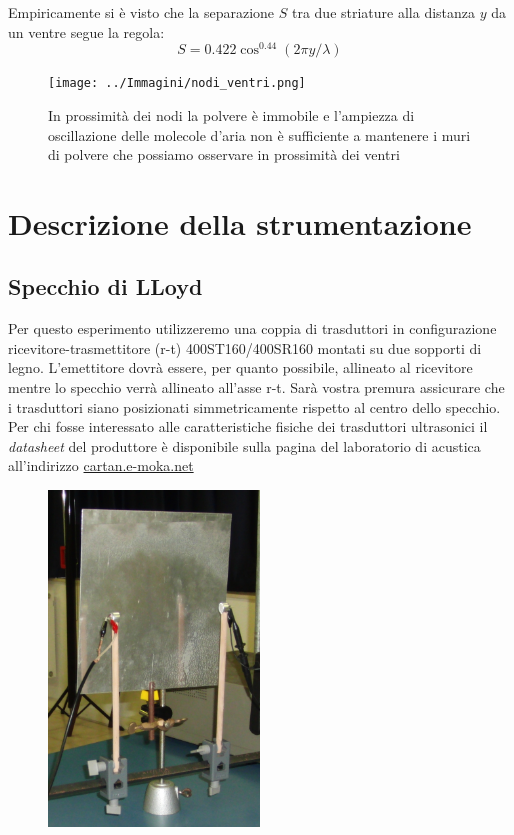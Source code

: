 \documentclass[a4paper,10pt,oneside]{article}
\begin{document}
Empiricamente si è visto che la separazione $S$ tra due striature alla distanza $y$ da un ventre segue la regola:
\begin{equation}
 S=0.422\cos^{0.44}(2\pi y/\lambda)
\end{equation}


\begin{figure}[H]
 \centering
 \texttt{[image: ../Immagini/nodi\_ventri.png]}
 \caption{In prossimità dei nodi la polvere è immobile e l'ampiezza di oscillazione delle molecole d'aria non è sufficiente a mantenere i muri di polvere che possiamo osservare in prossimità dei ventri}
 \label{fig:striature_ventri}
\end{figure}


\section*{Descrizione della strumentazione}

\subsection*{Specchio di LLoyd}

Per questo esperimento utilizzeremo una coppia di trasduttori in configurazione ricevitore-trasmettitore (r-t) 400ST160/400SR160 montati su due sopporti di legno. L'emettitore dovrà essere, per quanto possibile, allineato al ricevitore mentre lo specchio verrà allineato all'asse r-t. Sarà vostra premura assicurare che i trasduttori siano posizionati simmetricamente rispetto al centro dello specchio. Per chi fosse interessato alle caratteristiche fisiche dei trasduttori ultrasonici il \emph{datasheet} del produttore è disponibile sulla pagina del laboratorio di acustica all'indirizzo \url{cartan.e-moka.net}

\begin{figure}[H]
 \centering
 \includegraphics[width=0.5\textwidth]{../Immagini/specchio_llody.JPG}
 \label{fig:specchio_llody_lab}
\end{figure}
\end{document}
